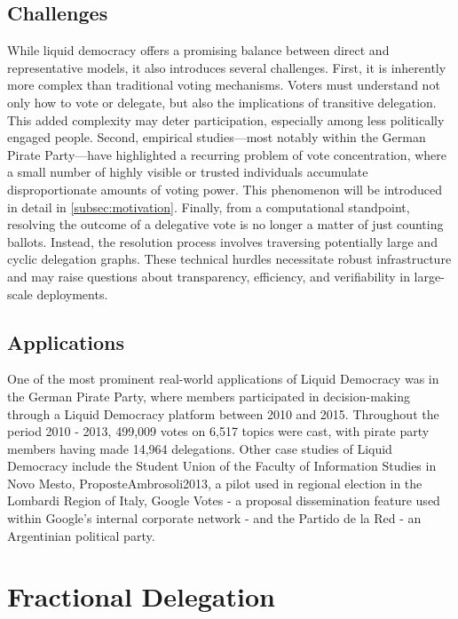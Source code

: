 \subsection{Challenges}

While liquid democracy offers a promising balance between direct and representative models, it also introduces several challenges. First, it is inherently more complex than traditional voting mechanisms. Voters must understand not only how to vote or delegate, but also the implications of transitive delegation. This added complexity may deter participation, especially among less politically engaged people. Second, empirical studies—most notably within the German Pirate Party—have highlighted a recurring problem of vote concentration, where a small number of highly visible or trusted individuals accumulate disproportionate amounts of voting power. This phenomenon will be introduced in detail in \cref{subsec:motivation}. Finally, from a computational standpoint, resolving the outcome of a delegative vote is no longer a matter of just counting ballots. Instead, the resolution process involves traversing potentially large and cyclic delegation graphs. These technical hurdles necessitate robust infrastructure and may raise questions about transparency, efficiency, and verifiability in large-scale deployments.

\subsection{Applications}

One of the most prominent real-world applications of Liquid Democracy was in the German Pirate Party, where members participated in decision-making through a Liquid Democracy platform between 2010 and 2015. \cite{paulinOverviewTenYears2020} Throughout the period 2010 - 2013, 499,009 votes on 6,517 topics were cast, with pirate party members having made 14,964 delegations. \cite{klingVotingBehaviourPower2015} Other case studies of Liquid Democracy include the Student Union of the Faculty of Information Studies in Novo Mesto, ProposteAmbrosoli2013, a pilot used in regional election in the Lombardi Region of Italy, Google Votes - a proposal dissemination feature used within Google’s internal corporate network - and the Partido de la Red - an Argentinian political party. \cite{paulinOverviewTenYears2020}

\section{Fractional Delegation}

